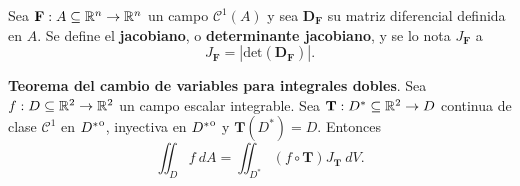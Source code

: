 \begin{definition}
    Sea $\mathbf{F}:A\subseteq\mathbb{R}^n\to\mathbb{R}^n$ un campo $\mathcal{C}^1(A)$ y sea $\boldsymbol{D}_\mathbf{F}$ su matriz diferencial definida en $A$. Se define el \textbf{jacobiano}, o \textbf{determinante jacobiano}, y se lo nota $J_\mathbf{F}$ a 
    \[
        J_\mathbf{F}=\left|\text{det}(\boldsymbol{D}_\mathbf{F})\right|.
    \]
\end{definition}

\begin{theorem} %
    \textbf{Teorema del cambio de variables para integrales dobles}. Sea $f:D\subseteq\mathbb{R}^2\to\mathbb{R}^2$ un campo escalar integrable. Sea $\mathbf{T}:D^*\subseteq\mathbb{R}^2\to D$ continua de clase $\mathcal{C}^1$ en ${\kern0ptD^*}^{\mathrm{o}}$, inyectiva en ${\kern0ptD^*}^{\mathrm{o}}$ y $\mathbf{T}(D^*)=D$. Entonces
    \[
        \iint_D f\:dA=\iint_{D^*}(f\circ\mathbf{T})J_\mathbf{T}\:dV.
    \]
\end{theorem}